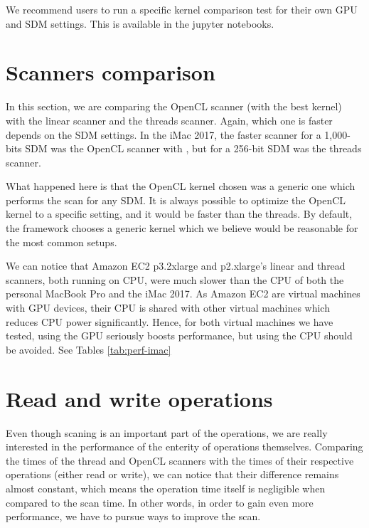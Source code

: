 We recommend users to run a specific kernel comparison test for their own GPU and SDM settings.  This is available in the jupyter notebooks.


\section{Scanners comparison}

In this section, we are comparing the OpenCL scanner (with the best kernel) with the linear scanner and the threads scanner. Again, which one is faster depends on the SDM settings. In the iMac 2017, the faster scanner for a 1,000-bits SDM was the OpenCL scanner with , but for a 256-bit SDM was the threads scanner.

What happened here is that the OpenCL kernel chosen was a generic one which performs the scan for any SDM. It is always possible to optimize the OpenCL kernel to a specific setting, and it would be faster than the threads. By default, the framework chooses a generic kernel which we believe would be reasonable for the most common setups.

We can notice that Amazon EC2 p3.2xlarge and p2.xlarge's linear and thread scanners, both running on CPU, were much slower than the CPU of both the personal MacBook Pro and the iMac 2017. As Amazon EC2 are virtual machines with GPU devices, their CPU is shared with other virtual machines which reduces CPU power significantly. Hence, for both virtual machines we have tested, using the GPU seriously boosts performance, but using the CPU should be avoided. See Tables \ref{tab:perf-imac}

\section{Read and write operations}

Even though scaning is an important part of the operations, we are really interested in the performance of the enterity of operations themselves. Comparing the times of the thread and OpenCL scanners with the times of their respective operations (either read or write), we can notice that their difference remains almost constant, which means the operation time itself is negligible when compared to the scan time. In other words, in order to gain even more performance, we have to pursue ways to improve the scan.


